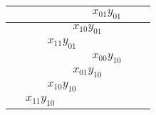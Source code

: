\begin{center}
\begin{tabular}{|c|c|c|c|c|c|c|c|}
\hspace{15pt} & \hspace{15pt} & \hspace{15pt} & \hspace{15pt} & \multicolumn{2}{c|}{$x_{01}y_{01}$} & \hspace{15pt} & \hspace{15pt} \\ \hline
\hspace{15pt} & \hspace{15pt} & \hspace{15pt} & \multicolumn{2}{c|}{$x_{10}y_{01}$} & \hspace{15pt} & \hspace{15pt} & \hspace{15pt} \\ \hline
\hspace{15pt} & \hspace{15pt} & \multicolumn{2}{c|}{$x_{11}y_{01}$} & \hspace{15pt} & \hspace{15pt} & \hspace{15pt} & \hspace{15pt} \\ \hline\hline
\hspace{15pt} & \hspace{15pt} & \hspace{15pt} & \hspace{15pt} & \multicolumn{2}{c|}{$x_{00}y_{10}$} & \hspace{15pt} & \hspace{15pt} \\ \hline
\hspace{15pt} & \hspace{15pt} & \hspace{15pt} & \multicolumn{2}{c|}{$x_{01}y_{10}$} & \hspace{15pt} & \hspace{15pt} & \hspace{15pt} \\ \hline
\hspace{15pt} & \hspace{15pt} & \multicolumn{2}{c|}{$x_{10}y_{10}$} & \hspace{15pt} & \hspace{15pt} & \hspace{15pt} & \hspace{15pt} \\ \hline
\hspace{15pt} & \multicolumn{2}{c|}{$x_{11}y_{10}$} & \hspace{15pt} & \hspace{15pt} & \hspace{15pt} & \hspace{15pt} & \hspace{15pt} \\ \hline\hline

\end{tabular}
\end{center}
